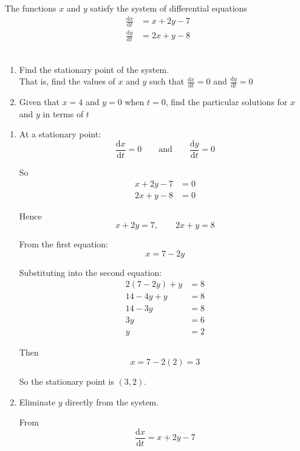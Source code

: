 \documentclass[leqno]{article}
\begin{document}
\begin{enumerate}[
  label=\textbf{\arabic*.},
  leftmargin=*,
  topsep=0pt,
  partopsep=0pt,
  parsep=0pt
]
The functions $x$ and $y$ satisfy the system of differential equations
\begin{align*}
\frac{\mathrm{d}x}{\mathrm{d}t}&=x+2y-7 \\[5pt]
\frac{\mathrm{d}y}{\mathrm{d}t}&=2x+y-8
\end{align*}\\
\begin{enumerate}[label=\textbf{(\alph*)}]
  \item Find the stationary point of the system.\\ That is, find the values of $x$ and $y$ such that $\frac{\mathrm{d}x}{\mathrm{d}t}=0$ and $\frac{\mathrm{d}y}{\mathrm{d}t}=0$  \\
  \item Given that $x=4$ and $y=0$ when $t=0$, find the particular solutions for $x$ and $y$ in terms of $t$  \\
\end{enumerate}

\vspace*{10pt}

\begin{djsSolution}
\begin{enumerate}[label=\textbf{(\alph*)}]
  \item At a stationary point:
  \[
  \frac{\mathrm{d}x}{\mathrm{d}t}=0
  \qquad \text{and} \qquad
  \frac{\mathrm{d}y}{\mathrm{d}t}=0
  \]

  So
  \begin{align*}
  x+2y-7&=0\\
  2x+y-8&=0
  \end{align*}

  Hence
  \[
  x+2y=7, \qquad 2x+y=8
  \]

  From the first equation:
  \[
  x=7-2y
  \]

  Substituting into the second equation:
  \begin{align*}
  2(7-2y)+y&=8\\
  14-4y+y&=8\\
  14-3y&=8\\
  3y&=6\\
  y&=2
  \end{align*}

  Then
  \[
  x=7-2(2)=3
  \]

  So the stationary point is $(3,2)$.

  \item Eliminate $y$ directly from the system.

  From
  \[
  \frac{\mathrm{d}x}{\mathrm{d}t}=x+2y-7
  \]


\end{enumerate}
\end{djsSolution}
\end{enumerate}
\end{document}

